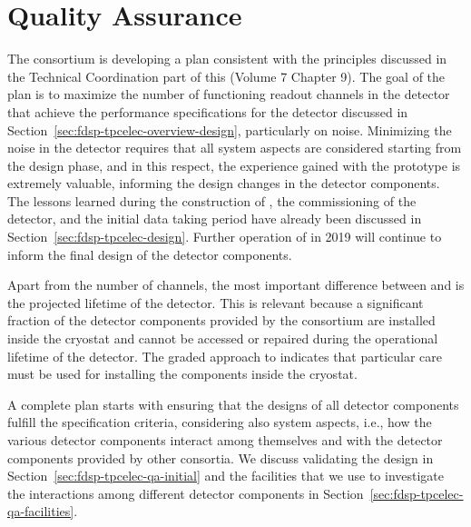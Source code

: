 \section{Quality Assurance}
\label{sec:fdsp-tpcelec-qa}

The  consortium is developing a  plan consistent
with the principles discussed in the Technical Coordination part of this 
 (Volume 7 Chapter 9). %
The goal of the  plan is to maximize the number of functioning
readout channels in the detector that achieve the performance specifications
for the detector discussed in Section~\ref{sec:fdsp-tpcelec-overview-design},
particularly on noise. Minimizing the noise in the detector requires that all
system aspects are considered starting from the design phase, and in this
respect, the experience gained with the  prototype is extremely
valuable, informing the design changes in the detector 
components. The lessons learned during the construction of ,
the commissioning of the detector, and the initial data taking period have
already been discussed in Section~\ref{sec:fdsp-tpcelec-design}. Further
operation of  in 2019 will continue to inform the final design
of the detector components.

Apart from the number of channels, the most important difference
between  and  is the projected lifetime of the detector. This
is relevant because a significant fraction of the detector components provided 
by the  consortium are installed inside the cryostat and cannot 
be accessed or repaired during the operational lifetime of the detector. The 
graded approach to  indicates that particular care must be used for installing the  components inside the cryostat.

A complete  plan starts with ensuring that the designs of all
detector components fulfill the specification criteria, considering
also system aspects, i.e., how the various detector components interact
among themselves and with the detector components provided by other 
consortia. We discuss validating the design in 
Section~\ref{sec:fdsp-tpcelec-qa-initial} and the facilities that we use
to investigate the interactions among different detector components
in Section~\ref{sec:fdsp-tpcelec-qa-facilities}. 

